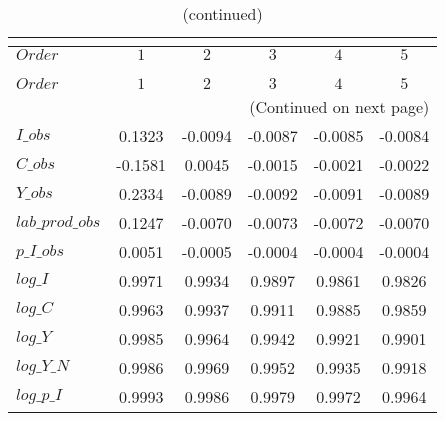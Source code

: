  
\begin{center}
\begin{longtable}{lccccc} 
\caption{COEFFICIENTS OF AUTOCORRELATION}\\
 \label{Table:th_autocorr_matrix}\\
\toprule 
$Order           $	 & 	 $          1$	 & 	 $          2$	 & 	 $          3$	 & 	 $          4$	 & 	 $          5$\\
\midrule \endfirsthead 
\caption{(continued)}\\
 \toprule \\ 
$Order           $	 & 	 $          1$	 & 	 $          2$	 & 	 $          3$	 & 	 $          4$	 & 	 $          5$\\
\midrule \endhead 
\midrule \multicolumn{6}{r}{(Continued on next page)} \\ \bottomrule \endfoot 
\bottomrule \endlastfoot 
$I\_obs          $	 & 	     0.1323	 & 	    -0.0094	 & 	    -0.0087	 & 	    -0.0085	 & 	    -0.0084 \\ 
$C\_obs          $	 & 	    -0.1581	 & 	     0.0045	 & 	    -0.0015	 & 	    -0.0021	 & 	    -0.0022 \\ 
$Y\_obs          $	 & 	     0.2334	 & 	    -0.0089	 & 	    -0.0092	 & 	    -0.0091	 & 	    -0.0089 \\ 
$lab\_prod\_obs  $	 & 	     0.1247	 & 	    -0.0070	 & 	    -0.0073	 & 	    -0.0072	 & 	    -0.0070 \\ 
$p\_I\_obs       $	 & 	     0.0051	 & 	    -0.0005	 & 	    -0.0004	 & 	    -0.0004	 & 	    -0.0004 \\ 
$log\_I          $	 & 	     0.9971	 & 	     0.9934	 & 	     0.9897	 & 	     0.9861	 & 	     0.9826 \\ 
$log\_C          $	 & 	     0.9963	 & 	     0.9937	 & 	     0.9911	 & 	     0.9885	 & 	     0.9859 \\ 
$log\_Y          $	 & 	     0.9985	 & 	     0.9964	 & 	     0.9942	 & 	     0.9921	 & 	     0.9901 \\ 
$log\_Y\_N       $	 & 	     0.9986	 & 	     0.9969	 & 	     0.9952	 & 	     0.9935	 & 	     0.9918 \\ 
$log\_p\_I       $	 & 	     0.9993	 & 	     0.9986	 & 	     0.9979	 & 	     0.9972	 & 	     0.9964 \\ 
\end{longtable}
 \end{center}
